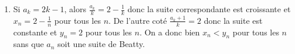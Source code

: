 \begin{enumerate}
\begin{enumerate}
\item Si $a_k = 2k-1$, alors $\frac{a_k}{k}=2-\frac{1}{k}$ donc la suite correspondante est croissante et $x_n=2-\frac{1}{n}$ pour tous les $n$. De l'autre coté $\frac{a_k+1}{k}=2$ donc la suite est constante et $y_n=2$ pour tous les $n$. On a donc bien $x_n<y_n$ pour tous les $n$ sans que $a_n$ soit une suite de Beatty.
\end{enumerate}

\end{enumerate}
